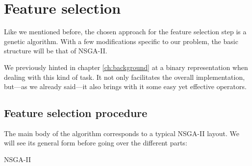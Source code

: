 \chapter{Feature selection}\label{ch:featureselection}

Like we mentioned before, the chosen approach for the feature selection step is a genetic algorithm. With a few modifications specific to our problem, the basic structure will be that of \acs{NSGA-II}.

We previously hinted in chapter \ref{ch:background} at a binary representation when dealing with this kind of task. It not only facilitates the overall implementation, but---as we already said---it also brings with it some easy yet effective operators.

\section{Feature selection procedure}

	The main body of the algorithm corresponds to a typical \acs{NSGA-II} layout. We will see its general form before going over the different parts:

	\vspace{0.2cm}

	\begin{algorithm}[H]


		\caption{NSGA-II}

	\end{algorithm}


